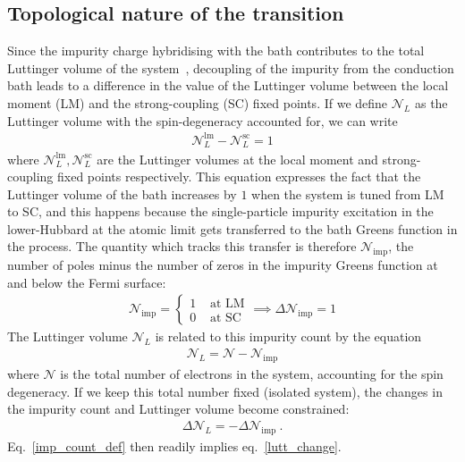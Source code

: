 \documentclass{report}
\numberwithin{equation}{section}
\begin{document}
\subsection{Topological nature of the transition}
Since the impurity charge hybridising with the bath contributes to the total Luttinger volume of the system~\cite{martin1982fermi}, decoupling of the impurity from the conduction bath leads to a difference in the value of the Luttinger volume between the local moment (LM) and the strong-coupling (SC) fixed points. If we define \(\mathcal{N}_L\) as the Luttinger volume with the spin-degeneracy accounted for, we can write
\begin{equation}\begin{aligned}
	\label{lutt_change}
	\mathcal{N}_L^\text{lm} - \mathcal{N}_L^\text{sc} = 1
\end{aligned}\end{equation}
where \(\mathcal{N}_L^\text{lm},\mathcal{N}_L^\text{sc}\) are the Luttinger volumes at the local moment and strong-coupling fixed points respectively. This equation expresses the fact that the Luttinger volume of the bath increases by \(1\) when the system is tuned from LM to SC, and this happens because the single-particle impurity excitation in the lower-Hubbard at the atomic limit gets transferred to the bath Greens function in the process. The quantity which tracks this transfer is therefore \(\mathcal{N}_\text{imp}\), the number of poles minus the number of zeros in the impurity Greens function at and below the Fermi surface:
\begin{equation}\begin{aligned}
	\label{imp_count_def}
	\mathcal{N}_\text{imp} = \begin{cases}
		1 & \text{ at LM}\\
		0 & \text{ at SC}
	\end{cases}\implies \Delta \mathcal{N}_\text{imp} = 1
\end{aligned}\end{equation}
The Luttinger volume \(\mathcal{N}_L\) is related to this impurity count by the equation
\begin{equation}\begin{aligned}
	\mathcal{N}_L = \mathcal{N} - \mathcal{N}_\text{imp}
\end{aligned}\end{equation}
where \(\mathcal{N}\) is the total number of electrons in the system, accounting for the spin degeneracy. If we keep this total number fixed (isolated system), the changes in the impurity count and Luttinger volume become constrained: 
\begin{equation}\begin{aligned}
	\Delta \mathcal{N}_L = - \Delta \mathcal{N}_\text{imp}~.
\end{aligned}\end{equation}
Eq.~\ref{imp_count_def} then readily implies eq.~\ref{lutt_change}.
\end{document}
